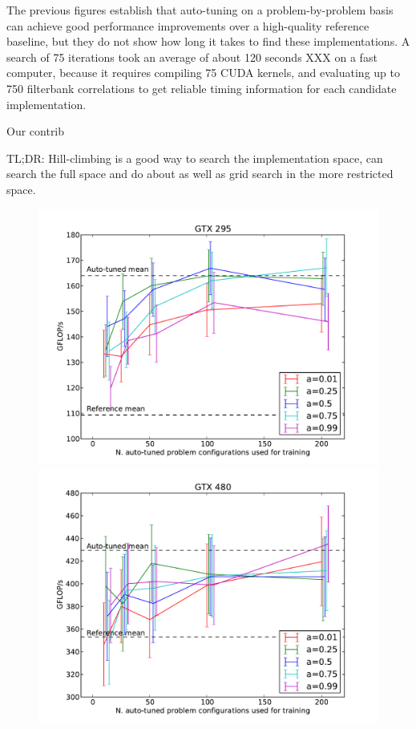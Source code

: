 \documentclass{sig-alternate}
\begin{document}
The previous figures establish that auto-tuning on a problem-by-problem basis can achieve good performance improvements over a high-quality reference baseline, but they do not show how long it takes to find these implementations.  A search of 75 iterations took an average of about 120 seconds XXX on a fast computer, because it requires compiling 75 CUDA kernels, and evaluating up to 750 filterbank correlations to get reliable timing information for each candidate implementation.

Our contrib

TL;DR: Hill-climbing is a good way to search the implementation space, can
search the full space and do about as well as grid search in the more
restricted space.


\begin{figure}
\centering
\includegraphics[scale=.42]{fig_ntrain_295.pdf} %
\includegraphics[scale=.42]{fig_ntrain_480.pdf} %

\end{figure}
\end{document}
